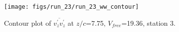 \begin{figure}[H]
\centering
\texttt{[image: figs/run\_23/run\_23\_ww\_contour]}
\caption{Contour plot of $\overline{v_{z}^{\prime} v_{z}^{\prime}}$ at $z/c$=7.75, $V_{free}$=19.36, station 3.}
\label{fig:run_23_ww_contour}
\end{figure}


